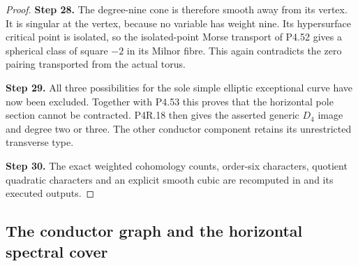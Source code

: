 \begin{proof}
\noindent\textbf{Step 28.} The degree-nine cone is therefore smooth
away from its vertex. It is singular
at the vertex, because no variable has
weight nine. Its hypersurface critical
point is isolated, so the isolated-point
Morse transport of P4.52 gives a spherical
class of square $-2$ in its Milnor fibre.
This again contradicts the zero pairing
transported from the actual torus.

\noindent\textbf{Step 29.} All three possibilities for the sole
simple elliptic exceptional curve have
now been excluded. Together with P4.53
this proves that the horizontal pole
section cannot be contracted. P4R.18
then gives the asserted generic $D_4$
image and degree two or three. The
other conductor component retains its
unrestricted transverse type.

\noindent\textbf{Step 30.} The exact weighted cohomology counts,
order-six characters, quotient quadratic
characters and an explicit smooth cubic
are recomputed in
\allowbreak{}
and its executed outputs.
\end{proof}


\subsection{The conductor graph and the horizontal spectral cover}

